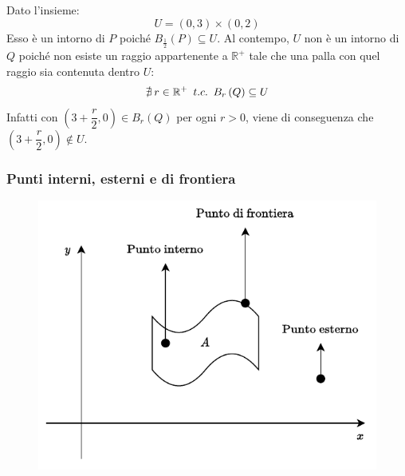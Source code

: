 \documentclass[a4paper]{article}
\begin{document}
	\noindent
	Dato l'insieme:
	\begin{equation*}
		U = \left(0,3\right) \times \left(0,2\right)
	\end{equation*}
	Esso è un intorno di $P$ poiché $B_{\frac{1}{2}}\left(P\right) \subseteq U$. Al contempo, $U$ non è un intorno di $Q$ poiché non esiste un raggio appartenente a $\mathbb{R}^{+}$ tale che una palla con quel raggio sia contenuta dentro $U$:
	\begin{equation*}
		\nexists \: r \in \mathbb{R}^{+} \hspace{.5em} t.c. \hspace{.5em} B_{r}\left(Q\right) \subseteq U
	\end{equation*}
	Infatti con $\left(3+\dfrac{r}{2}, 0\right) \in B_{r}\left(Q\right)$ per ogni $r>0$, viene di conseguenza che $\left(3+\dfrac{r}{2}, 0\right) \notin U$.\newpage

	\subsubsection{Punti interni, esterni e di frontiera}\label{subsubsection: punti interni, esterni e di frontiera}

	\begin{figure}[!htp]
		\centering
		\includegraphics[width=.8\textwidth]{img/punto-interno_esterno_frontiera.pdf}
	\end{figure}
\end{document}
